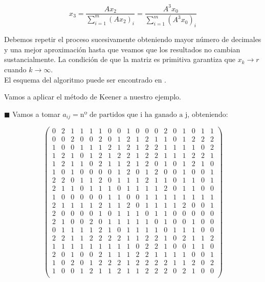 \begin{equation*}
x_{3}=\dfrac{Ax_{2}}{\sum_{i=1}^{m}(Ax_{2})_{i}} = \dfrac{A^{3}x_{0}}{\sum_{i=1}^{m}(A^{3}x_{0})_{i}}
\end{equation*}

Debemos repetir el proceso sucesivamente obteniendo mayor número de decimales y una mejor aproximación hasta que veamos que los resultados no cambian sustancialmente. La condición de que la matriz es primitiva garantiza que $x_{k} \rightarrow r$ cuando $k \rightarrow \infty$.\\
El esquema del algoritmo puede ser encontrado en \cite{power_method}.


\begin{ejem} Vamos a aplicar el método de Keener a nuestro ejemplo.\\
\end{ejem}
	$\blacksquare $ Vamos a tomar $a_{ij} = \text{nº de partidos que i ha ganado a j}$, obteniendo:
	
	\[
	\left(\begin{array}{cccccccccccccccccc}
	0 & 2 & 1 & 1 & 1 & 1 & 0 & 0 & 1 & 0 & 0 & 0 & 2 & 0 & 1 & 0 & 1 & 1\\
	0 & 0 & 2 & 0 & 0 & 2 & 0 & 1 & 2 & 1 & 2 & 1 & 1 & 0 & 1 & 2 & 2 & 2\\
	1 & 0 & 0 & 1 & 1 & 1 & 2 & 1 & 2 & 1 & 2 & 2 & 1 & 1 & 1 & 1 & 0 & 2\\
	1 & 2 & 1 & 0 & 1 & 2 & 1 & 2 & 2 & 1 & 2 & 2 & 1 & 1 & 1 & 2 & 2 & 1\\
	1 & 2 & 1 & 1 & 0 & 2 & 1 & 1 & 2 & 1 & 2 & 0 & 1 & 0 & 1 & 2 & 1 & 0\\
	1 & 0 & 1 & 0 & 0 & 0 & 0 & 1 & 2 & 0 & 1 & 2 & 0 & 0 & 1 & 0 & 0 & 1\\
	2 & 2 & 0 & 1 & 1 & 2 & 0 & 1 & 1 & 1 & 2 & 1 & 1 & 0 & 1 & 1 & 0 & 1\\
	2 & 1 & 1 & 0 & 1 & 1 & 1 & 0 & 1 & 1 & 1 & 1 & 2 & 0 & 1 & 1 & 0 & 0\\
	1 & 0 & 0 & 0 & 0 & 0 & 1 & 1 & 0 & 0 & 1 & 1 & 1 & 1 & 1 & 1 & 1 & 1\\
	2 & 1 & 1 & 1 & 1 & 2 & 1 & 1 & 2 & 0 & 1 & 1 & 1 & 1 & 2 & 0 & 0 & 1\\
	2 & 0 & 0 & 0 & 0 & 1 & 0 & 1 & 1 & 1 & 0 & 1 & 1 & 0 & 0 & 0 & 0 & 0\\
	2 & 1 & 0 & 0 & 2 & 0 & 1 & 1 & 1 & 1 & 1 & 0 & 1 & 0 & 0 & 1 & 0 & 0\\
	0 & 1 & 1 & 1 & 1 & 2 & 1 & 0 & 1 & 1 & 1 & 1 & 0 & 1 & 1 & 1 & 0 & 0\\
	2 & 2 & 1 & 1 & 2 & 2 & 2 & 2 & 1 & 1 & 2 & 2 & 1 & 0 & 2 & 1 & 1 & 2\\
	1 & 1 & 1 & 1 & 1 & 1 & 1 & 1 & 1 & 0 & 2 & 2 & 1 & 0 & 0 & 1 & 1 & 0\\
	2 & 0 & 1 & 0 & 0 & 2 & 1 & 1 & 1 & 2 & 2 & 1 & 1 & 1 & 1 & 0 & 0 & 1\\
	1 & 0 & 2 & 0 & 1 & 2 & 2 & 2 & 1 & 2 & 2 & 2 & 2 & 1 & 1 & 2 & 0 & 2\\
	1 & 0 & 0 & 1 & 2 & 1 & 1 & 2 & 1 & 1 & 2 & 2 & 2 & 0 & 2 & 1 & 0 & 0\\
	\end{array} \right) 
	\]
	
